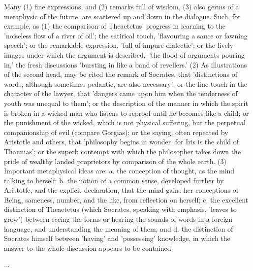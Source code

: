 Many (1) fine expressions, and (2) remarks full of wisdom, (3) also
germs of a metaphysic of the future, are scattered up and down in
the dialogue. Such, for example, as (1) the comparison of Theaetetus'
progress in learning to the 'noiseless flow of a river of oil';
the satirical touch, 'flavouring a sauce or fawning speech'; or the
remarkable expression, 'full of impure dialectic'; or the lively images
under which the argument is described,--'the flood of arguments pouring
in,' the fresh discussions 'bursting in like a band of revellers.'
(2) As illustrations of the second head, may be cited the remark of
Socrates, that 'distinctions of words, although sometimes pedantic, are
also necessary'; or the fine touch in the character of the lawyer,
that 'dangers came upon him when the tenderness of youth was unequal to
them'; or the description of the manner in which the spirit is broken
in a wicked man who listens to reproof until he becomes like a child; or
the punishment of the wicked, which is not physical suffering, but the
perpetual companionship of evil (compare Gorgias); or the saying, often
repeated by Aristotle and others, that 'philosophy begins in wonder,
for Iris is the child of Thaumas'; or the superb contempt with which
the philosopher takes down the pride of wealthy landed proprietors by
comparison of the whole earth. (3) Important metaphysical ideas are: a.
the conception of thought, as the mind talking to herself; b. the notion
of a common sense, developed further by Aristotle, and the explicit
declaration, that the mind gains her conceptions of Being, sameness,
number, and the like, from reflection on herself; c. the excellent
distinction of Theaetetus (which Socrates, speaking with emphasis,
'leaves to grow') between seeing the forms or hearing the sounds of
words in a foreign language, and understanding the meaning of them; and
d. the distinction of Socrates himself between 'having' and 'possessing'
knowledge, in which the answer to the whole discussion appears to be
contained.

...

